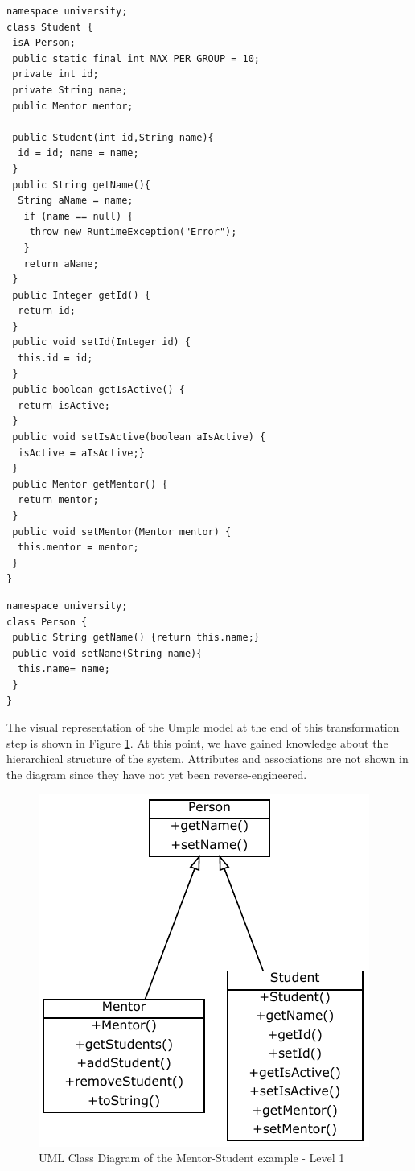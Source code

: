 \begin{lstlisting}[style=UmpleIn,caption=Student.ump,label=lst:studentUmple0]
namespace university;
class Student {
 isA Person;
 public static final int MAX_PER_GROUP = 10; 
 private int id; 
 private String name;
 public Mentor mentor; 

 public Student(int id,String name){ 
  id = id; name = name; 
 } 
 public String getName(){
  String aName = name;
   if (name == null) { 
    throw new RuntimeException("Error");
   } 
   return aName; 
 }
 public Integer getId() {
  return id;
 }
 public void setId(Integer id) { 
  this.id = id; 
 } 
 public boolean getIsActive() { 
  return isActive;
 }
 public void setIsActive(boolean aIsActive) {
  isActive = aIsActive;} 
 }   
 public Mentor getMentor() { 
  return mentor; 
 }
 public void setMentor(Mentor mentor) { 
  this.mentor = mentor; 
 } 
}
\end{lstlisting}

\begin{lstlisting}[style=UmpleIn,caption=Person.ump,label=lst:personUmple0]
namespace university;
class Person { 
 public String getName() {return this.name;}
 public void setName(String name){
  this.name= name;
 }
}
\end{lstlisting}

The visual representation of the Umple model at the end of this transformation step is shown in Figure \ref{fig:Example1a1}. At this point, we have gained knowledge about the hierarchical structure of the system. Attributes and associations are not shown in the diagram since they have not yet been reverse-engineered.

\begin{figure}[h]
\centering
\includegraphics{Figures/Example1a1.pdf} 
\caption{UML Class Diagram of the Mentor-Student example - Level 1}
\label{fig:Example1a1}
\end{figure}

